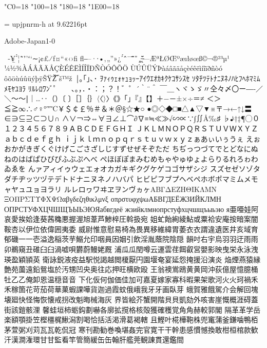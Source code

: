 %
%
%
%
\kcatcode"C0=18%
\kcatcode"100=18%
\kcatcode"180=18%
\kcatcode"1E00=18%

\font\upjpnrm = upjpnrm-h at 9.62216pt
\upjpnrm


Adobe-Japan1-0

 ‑¥̲ˋ̀¦˜̃ʼ’ʻ‘∼¡¢£⁄ƒ¤“«‹›ﬁ
ﬂ‒–·∙•‚„”»¿ˊ́ˆ̂¯ˉ̄̆̇̈˚̊¸̧
̶̨̋̌—ÆªŁØŒºæıłøœß­©¬®²³µ¹
¼½¾ÀÁÂÃÄÅÇÈÉÊËÌÍÎÏÐÑÒÓÔÕÖ
ÙÚÛÜÝÞàáâãäåçèéêëìíîïðñòó
ôõöùúûüýþÿŠŸŽ̅‾š™ž ￨｡｢｣､･
ｦｧｨｩｪｫｬｭｮｯｰｱｲｳｴｵｶｷｸｹｺｻｼｽｾ
ｿﾀﾁﾂﾃﾄﾅﾆﾇﾈﾉﾊﾋﾌﾍﾎﾏﾐﾑﾒﾓﾔﾕﾖﾗ
ﾘﾙﾚﾛﾜﾝﾞﾟ 　、。，．・：；？！゛゜´｀¨＾
￣＿ヽヾゝゞ〃仝々〆〇ー―‐／＼〜～‖｜…‥（）〔
〕［］｛｝〈〈〉〉《》「」『』【】＋−－±×÷＝≠
＜＞≦≧∞∴♂♀°′″℃￥＄￠￡％＃＆＊＠§☆★○
●◎◇◆□■△▲▽▼※〒→←↑↓〓∈∋⊆⊇⊂⊃∪∩
∧∨￢⇒⇔∀∃∠⊥⌒∂∇≡≒≪≫√∽∝∵∫∬Å‰♯
♭♪†‡¶◯０１２３４５６７８９ＡＢＣＤＥＦＧＨＩ
ＪＫＬＭＮＯＰＱＲＳＴＵＶＷＸＹＺａｂｃｄｅｆｇｈ
ｉｊｋｌｍｎｏｐｑｒｓｔｕｖｗｘｙｚぁあぃいぅうぇ
えぉおかがきぎくぐけげこごさざしじすずせぜそぞただ
ちぢっつづてでとどなにぬねのはばぱひびぴふぶぷへべ
ぺほぼぽまみむめもゃやゅゆょよらりるれろゎわゐゑを
んァアィイゥウェエォオカガキギクグケゲコゴサザシジ
スズセゼソゾタダチヂッツヅテデトドナニヌネノハバパ
ヒビピフブプヘベペホボポマミムメモャヤュユョヨラリ
ルレロヮワヰヱヲンヴヵヶΑΒΓΔΕΖΗΘΙΚΛΜΝ
ΞΟΠΡΣΤΥΦΧΨΩαβγδεζηθικλμνξ
οπρστυφχψωАБВГДЕЁЖЗИЙКЛМН
ОПРСТУФХЦЧШЩЪЫЬЭЮЯабвгдеё
жзийклмнопрстуфхцчшщъыьэю
я亜唖娃阿哀愛挨姶逢葵茜穐悪握渥旭葦芦鯵梓圧斡扱宛
姐虻飴絢綾鮎或粟袷安庵按暗案闇鞍杏以伊位依偉囲夷委
威尉惟意慰易椅為畏異移維緯胃萎⾐衣謂違遺医井亥域育
郁磯⼀一壱溢逸稲茨芋鰯允印咽員因姻引飲淫胤蔭院陰隠
韻吋右宇烏⽻羽迂⾬雨卯鵜窺丑碓⾅臼渦嘘唄欝蔚鰻姥厩
浦⽠瓜閏噂云運雲荏餌叡営嬰影映曳栄永泳洩瑛盈穎頴英
衛詠鋭液疫益駅悦謁越閲榎厭円園堰奄宴延怨掩援沿演炎
焔煙燕猿縁艶苑薗遠鉛鴛塩於汚甥凹央奥往応押旺横欧殴
王翁襖鴬鴎⻩黄岡沖荻億屋憶臆桶牡⼄乙俺卸恩温穏⾳音
下化仮何伽価佳加可嘉夏嫁家寡科暇果架歌河⽕火珂禍⽲
禾稼箇花苛茄荷華菓蝦課嘩貨迦過霞蚊俄峨我⽛牙画臥芽
蛾賀雅餓駕介会解回塊壊廻快怪悔恢懐戒拐改魁晦械海灰
界皆絵芥蟹開階⾙貝凱劾外咳害崖慨概涯碍蓋街該鎧骸浬
馨蛙垣柿蛎鈎劃嚇各廓拡撹格核殻獲確穫覚⾓角赫較郭閣
隔⾰革学岳楽額顎掛笠樫橿梶鰍潟割喝恰括活渇滑葛褐轄
且鰹叶椛樺鞄株兜竃蒲釜鎌噛鴨栢茅萱粥刈苅⽡瓦乾侃冠
寒刊勘勧巻喚堪姦完官寛⼲干幹患感慣憾換敢柑桓棺款歓
汗漢澗潅環⽢甘監看竿管簡緩⽸缶翰肝艦莞観諌貫還鑑間
